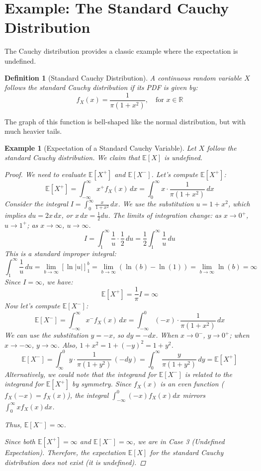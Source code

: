 \documentclass[11pt]{article}
\newtheorem{definition}{Definition}[section] %
\newtheorem{example}{Example}[section]       %
\theoremstyle{definition} %
\newcommand{\R}{\mathbb{R}}     %
\newcommand{\E}{\mathbb{E}}     %
\begin{document}
\section{Example: The Standard Cauchy Distribution}
\label{sec:cauchy}

The Cauchy distribution provides a classic example where the expectation is undefined.

\begin{definition}[Standard Cauchy Distribution]
A continuous random variable $X$ follows the standard Cauchy distribution if its PDF is given by:
\[
f_X(x) = \frac{1}{\pi(1 + x^2)}, \quad \text{for } x \in \R
\]
\end{definition}
The graph of this function is bell-shaped like the normal distribution, but with much heavier tails.

\begin{example}[Expectation of a Standard Cauchy Variable]
\label{ex:cauchy_expectation}
Let $X$ follow the standard Cauchy distribution. We claim that $\E[X]$ is undefined.

\begin{proof}
We need to evaluate $\E[X^+]$ and $\E[X^-]$. Let's compute $\E[X^+]$:
\[
\E[X^+] = \int_{-\infty}^{\infty} x^+ f_X(x) \, dx = \int_{0}^{\infty} x \cdot \frac{1}{\pi(1 + x^2)} \, dx
\]
Consider the integral $I = \int_{0}^{\infty} \frac{x}{1 + x^2} \, dx$. We use the substitution $u = 1 + x^2$, which implies $du = 2x \, dx$, or $x \, dx = \frac{1}{2} du$. The limits of integration change: as $x \to 0^+$, $u \to 1^+$; as $x \to \infty$, $u \to \infty$.
\[
I = \int_{1}^{\infty} \frac{1}{u} \cdot \frac{1}{2} \, du = \frac{1}{2} \int_{1}^{\infty} \frac{1}{u} \, du
\]
This is a standard improper integral:
\[
\int_{1}^{\infty} \frac{1}{u} \, du = \lim_{b \to \infty} [\ln|u|]_{1}^{b} = \lim_{b \to \infty} (\ln(b) - \ln(1)) = \lim_{b \to \infty} \ln(b) = \infty
\]
Since $I = \infty$, we have:
\[
\E[X^+] = \frac{1}{\pi} I = \infty
\]
Now let's compute $\E[X^-]$:
\[
\E[X^-] = \int_{-\infty}^{\infty} x^- f_X(x) \, dx = \int_{-\infty}^{0} (-x) \cdot \frac{1}{\pi(1 + x^2)} \, dx
\]
We can use the substitution $y = -x$, so $dy = -dx$. When $x \to 0^-$, $y \to 0^+$; when $x \to -\infty$, $y \to \infty$. Also, $1+x^2 = 1+(-y)^2 = 1+y^2$.
\[
\E[X^-] = \int_{\infty}^{0} y \cdot \frac{1}{\pi(1 + y^2)} \, (-dy) = \int_{0}^{\infty} \frac{y}{\pi(1 + y^2)} \, dy = \E[X^+]
\]
Alternatively, we could note that the integrand for $\E[X^-]$ is related to the integrand for $\E[X^+]$ by symmetry. Since $f_X(x)$ is an even function ($f_X(-x) = f_X(x)$), the integral $\int_{-\infty}^{0} (-x) f_X(x) dx$ mirrors $\int_{0}^{\infty} x f_X(x) dx$.

Thus, $\E[X^-] = \infty$.

Since both $\E[X^+] = \infty$ and $\E[X^-] = \infty$, we are in Case 3 (Undefined Expectation). Therefore, the expectation $\E[X]$ for the standard Cauchy distribution does not exist (it is undefined).
\end{proof}
\end{example}
\end{document}
